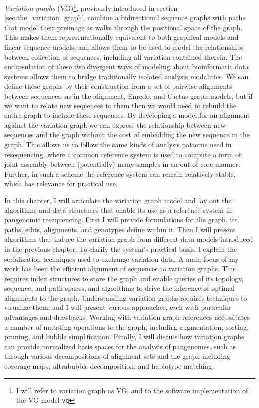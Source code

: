 \emph{Variation graphs} (VG)\footnote{I will refer to variation graph as VG, and to the software implementation of the VG model {\tt vg}}, previously introduced in section \ref{sec:the_variation_graph}, combine a bidirectional sequence graphs with paths that model their preimage as walks through the positional space of the graph.
This makes them representationally equivalent to both graphical models and linear sequence models, and allows them to be used to model the relationships between collection of sequences, including all variation contained therein.
The encapsulation of these two divergent ways of modeling about bioinformatic data systems allows them to bridge traditionally isolated analysis modalities.
We can define these graphs by their construction from a set of pairwise alignments between sequences, as in the alignment, Enredo, and Cactus graph models, but if we want to relate new sequences to them then we would need to rebuild the entire graph to include these sequences.
By developing a model for an alignment against the variation graph we can express the relationship between new sequences and the graph without the cost of embedding the new sequence in the graph.
This allows us to follow the same kinds of analysis patterns used in resequencing, where a common reference system is used to compute a form of joint assembly between (potentially) many samples in an out of core manner.
Further, in such a scheme the reference system can remain relatively stable, which has relevance for practical use.

In this chapter, I will articulate the variation graph model and lay out the algorithms and data structures that enable its use as a reference system in pangenomic resequencing.
First I will provide formulations for the graph, its paths, edits, alignments, and genotypes define within it.
Then I will present algorithms that induce the variation graph from different data models introduced in the previous chapter.
To clarify the system's practical basis, I explain the serialization techniques used to exchange variation data.
A main focus of my work has been the efficient alignment of sequences to variation graphs.
This requires index structures to store the graph and enable queries of its topology, sequence, and path spaces, and algorithms to drive the inference of optimal alignments to the graph.
Understanding variation graphs requires techniques to visualize them, and I will present various approaches, each with particular advantages and drawbacks.
Working with variation graph references necessitates a number of mutating operations to the graph, including augmentation, sorting, pruning, and bubble simplification.
Finally, I will discuss how variation graphs can provide normalized basis spaces for the analysis of pangenomes, such as through various decompositions of alignment sets and the graph including coverage maps, ultrabubble decomposition, and haplotype matching.

